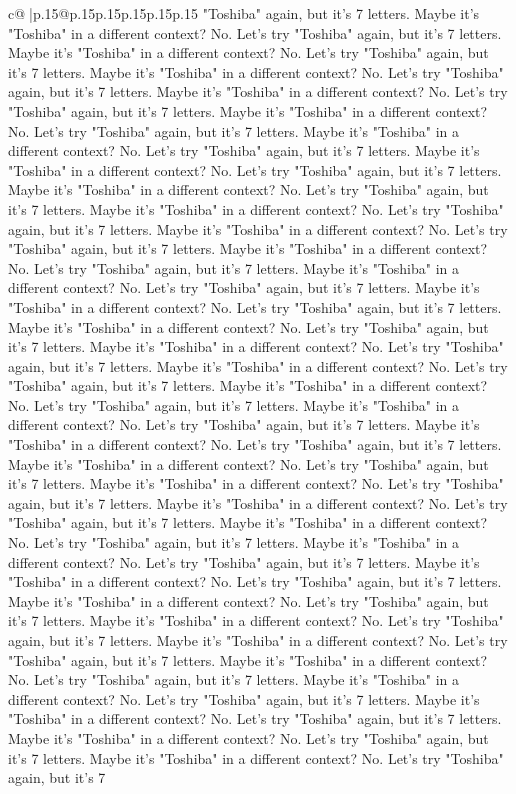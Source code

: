 \documentclass{article}
\begin{document}
{\begin{supertabular}{c@{$\;$}|p{.15\linewidth}@{}p{.15\linewidth}p{.15\linewidth}p{.15\linewidth}p{.15\linewidth}p{.15\linewidth}}
{{{"Toshiba" again, but it's 7 letters. Maybe it's "Toshiba" in a different context? No. Let's try "Toshiba" again, but it's 7 letters. Maybe it's "Toshiba" in a different context? No. Let's try "Toshiba" again, but it's 7 letters. Maybe it's "Toshiba" in a different context? No. Let's try "Toshiba" again, but it's 7 letters. Maybe it's "Toshiba" in a different context? No. Let's try "Toshiba" again, but it's 7 letters. Maybe it's "Toshiba" in a different context? No. Let's try "Toshiba" again, but it's 7 letters. Maybe it's "Toshiba" in a different context? No. Let's try "Toshiba" again, but it's 7 letters. Maybe it's "Toshiba" in a different context? No. Let's try "Toshiba" again, but it's 7 letters. Maybe it's "Toshiba" in a different context? No. Let's try "Toshiba" again, but it's 7 letters. Maybe it's "Toshiba" in a different context? No. Let's try "Toshiba" again, but it's 7 letters. Maybe it's "Toshiba" in a different context? No. Let's try "Toshiba" again, but it's 7 letters. Maybe it's "Toshiba" in a different context? No. Let's try "Toshiba" again, but it's 7 letters. Maybe it's "Toshiba" in a different context? No. Let's try "Toshiba" again, but it's 7 letters. Maybe it's "Toshiba" in a different context? No. Let's try "Toshiba" again, but it's 7 letters. Maybe it's "Toshiba" in a different context? No. Let's try "Toshiba" again, but it's 7 letters. Maybe it's "Toshiba" in a different context? No. Let's try "Toshiba" again, but it's 7 letters. Maybe it's "Toshiba" in a different context? No. Let's try "Toshiba" again, but it's 7 letters. Maybe it's "Toshiba" in a different context? No. Let's try "Toshiba" again, but it's 7 letters. Maybe it's "Toshiba" in a different context? No. Let's try "Toshiba" again, but it's 7 letters. Maybe it's "Toshiba" in a different context? No. Let's try "Toshiba" again, but it's 7 letters. Maybe it's "Toshiba" in a different context? No. Let's try "Toshiba" again, but it's 7 letters. Maybe it's "Toshiba" in a different context? No. Let's try "Toshiba" again, but it's 7 letters. Maybe it's "Toshiba" in a different context? No. Let's try "Toshiba" again, but it's 7 letters. Maybe it's "Toshiba" in a different context? No. Let's try "Toshiba" again, but it's 7 letters. Maybe it's "Toshiba" in a different context? No. Let's try "Toshiba" again, but it's 7 letters. Maybe it's "Toshiba" in a different context? No. Let's try "Toshiba" again, but it's 7 letters. Maybe it's "Toshiba" in a different context? No. Let's try "Toshiba" again, but it's 7 letters. Maybe it's "Toshiba" in a different context? No. Let's try "Toshiba" again, but it's 7 letters. Maybe it's "Toshiba" in a different context? No. Let's try "Toshiba" again, but it's 7 letters. Maybe it's "Toshiba" in a different context? No. Let's try "Toshiba" again, but it's 7 letters. Maybe it's "Toshiba" in a different context? No. Let's try "Toshiba" again, but it's 7 letters. Maybe it's "Toshiba" in a different context? No. Let's try "Toshiba" again, but it's 7 letters. Maybe it's "Toshiba" in a different context? No. Let's try "Toshiba" again, but it's 7 letters. Maybe it's "Toshiba" in a different context? No. Let's try "Toshiba" again, but it's 7 }}}
\end{supertabular}}
\end{document}

